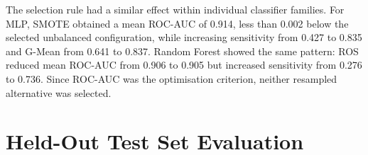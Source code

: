 The selection rule had a similar effect within individual classifier families. For MLP, SMOTE obtained a mean ROC-AUC of 0.914, less than 0.002 below the selected unbalanced configuration, while increasing sensitivity from 0.427 to 0.835 and G-Mean from 0.641 to 0.837. Random Forest showed the same pattern: ROS reduced mean ROC-AUC from 0.906 to 0.905 but increased sensitivity from 0.276 to 0.736. Since ROC-AUC was the optimisation criterion, neither resampled alternative was selected.

\section{Held-Out Test Set Evaluation}
\label{sec:s2r_test}

